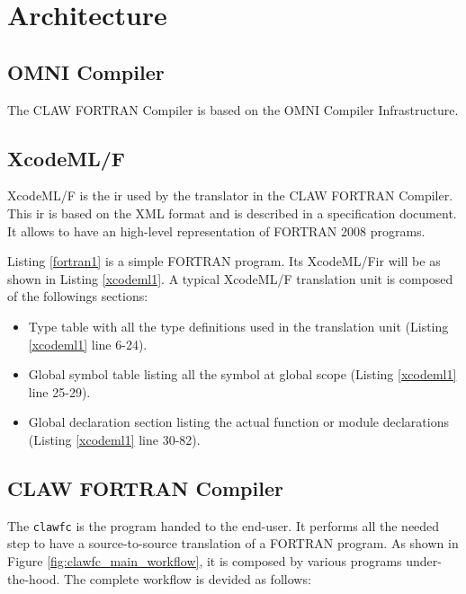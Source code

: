 \documentclass[a4paper, 11pt]{report}
\def\clawfcomp{CLAW FORTRAN Compiler\xspace}
\def\omni{OMNI Compiler Infrastructure\xspace}
\def\xcodeml{XcodeML/F\xspace}
\def\clawfc{\lstinline!clawfc!\xspace}
\newcommand{\emptypage}{}
\begin{document}
\emptypage
\pagebreak
\tableofcontents



\chapter{Architecture}
\section{OMNI Compiler}
The \clawfcomp is based on the \omni. 

\section{\xcodeml}
\xcodeml is the \gls{ir} used by the translator in the CLAW FORTRAN Compiler. This \gls{ir} is based on the XML format and is described in a specification document. It allows to have an high-level representation of FORTRAN 2008 programs.

Listing \ref{fortran1} is a simple FORTRAN program. Its \xcodeml \gls{ir} will be as shown in Listing \ref{xcodeml1}. A typical \xcodeml translation unit is composed of the followings sections: 
\begin{itemize}
\item Type table with all the type definitions used in the translation unit (Listing \ref{xcodeml1} line 6-24).
\item Global symbol table listing all the symbol at global scope (Listing \ref{xcodeml1} line 25-29).
\item Global declaration section listing the actual function or module declarations (Listing \ref{xcodeml1} line 30-82).
\end{itemize}





\section{\clawfcomp}

The \clawfc is the program handed to the end-user. It performs all the needed step to have a source-to-source translation of a FORTRAN program. As shown in Figure \ref{fig:clawfc_main_workflow}, it is composed by various programs under-the-hood. The complete workflow is devided as follows: 
\end{document}
